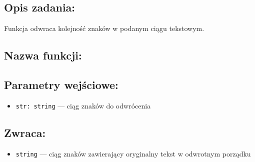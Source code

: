 \sectionZadanie

\subsection*{Opis zadania:}
Funkcja odwraca kolejność znaków w podanym ciągu tekstowym.

\subsection*{Nazwa funkcji:}

\subsection*{Parametry wejściowe:}
\begin{itemize}
  \item \texttt{str: string} — ciąg znaków do odwrócenia
\end{itemize}

\subsection*{Zwraca:}
\begin{itemize}
  \item \texttt{string} — ciąg znaków zawierający oryginalny tekst w odwrotnym porządku
\end{itemize}
